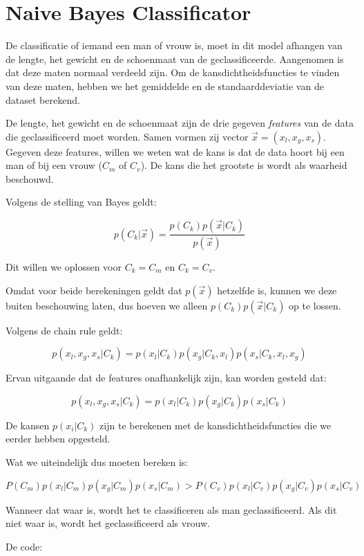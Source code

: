 \documentclass{article}
\begin{document}
\newpage

\section*{Naive Bayes Classificator}
De classificatie of iemand een man of vrouw is, moet in dit model afhangen van
de lengte, het gewicht en de schoenmaat van de geclassificeerde. Aangenomen is
dat deze maten normaal verdeeld zijn. Om de kansdichtheidsfuncties te vinden van
deze maten, hebben we het gemiddelde en de standaarddeviatie van de dataset
berekend.

De lengte, het gewicht en de schoenmaat zijn de drie gegeven \textit{features}
van de data die geclassificeerd moet worden. Samen vormen zij vector $\vec x =
(x_l,x_g,x_s)$. Gegeven deze features, willen we weten wat de kans is dat de
data hoort bij een man of bij een vrouw ($C_m$ of $C_v$). De kans die het
grootste is wordt als waarheid beschouwd.

Volgens de stelling van Bayes geldt:

$$ p(C_k|\vec x) = \frac{p(C_k)p(\vec x|C_k)}{p(\vec x)}$$

Dit willen we oplossen voor $C_k = C_m$ en $C_k = C_v$.

Omdat voor beide berekeningen geldt dat $p(\vec x)$ hetzelfde is, kunnen we deze
buiten beschouwing laten, dus hoeven we alleen $p(C_k)p(\vec x|C_k)$ op te
lossen.

Volgens de chain rule geldt:

$$p(x_l, x_g, x_s|C_k) = p(x_l|C_k)p(x_g|C_k,x_l)p(x_s|C_k,x_l,x_g)$$

Ervan uitgaande dat de features onafhankelijk zijn, kan worden gesteld dat:

$$p(x_l, x_g, x_s|C_k) = p(x_l|C_k)p(x_g|C_k)p(x_s|C_k)$$

De kansen $p(x_i|C_k)$ zijn te berekenen met de kansdichtheidsfuncties die we
eerder hebben opgesteld.

Wat we uiteindelijk dus moeten bereken is:

$$P(C_m)p(x_l|C_m)p(x_g|C_m)p(x_s|C_m) > P(C_v)p(x_l|C_v)p(x_g|C_v)p(x_s|C_v)$$

Wanneer dat waar is, wordt het te classificeren als man geclassificeerd. Als dit
niet waar is, wordt het geclassificeerd als vrouw.

De code:

\inputminted{python}{naive_noutf.py}
\end{document}
